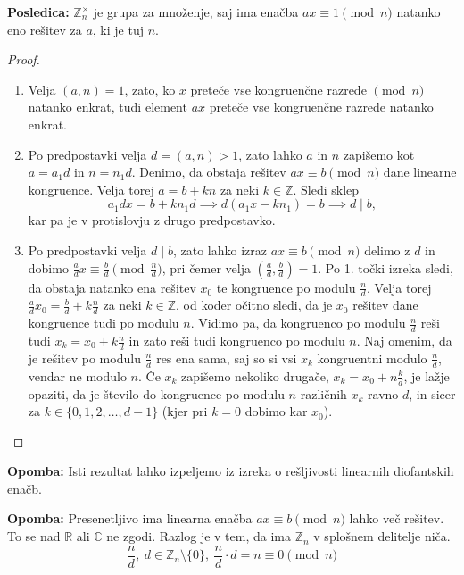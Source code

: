 \documentclass[12pt, a4paper]{article}
\newenvironment{opom}[1][]{\par\medskip\noindent \textbf{Opomba: }}{\medskip}
\newenvironment{posl}[1][]{\par\medskip\noindent \textbf{Posledica: }}{\medskip}
\begin{document}
\begin{posl}
$\mathbb{Z}_{n}^{\times}$ je grupa za množenje, saj ima enačba $ax\equiv 1 \pmod n$ natanko eno rešitev za $a$, ki je tuj $n$.
\end{posl}

\begin{proof}
\begin{enumerate}
\item Velja $(a,n)=1$, zato, ko $x$ preteče vse kongruenčne razrede $\pmod n$ natanko enkrat, tudi element $ax$ preteče vse kongruenčne razrede natanko enkrat.
\item Po predpostavki velja $d=(a,n)>1$, zato lahko $a$ in $n$ zapišemo kot $a=a_{1}d$ in $n=n_{1}d$. Denimo, da obstaja rešitev $ax\equiv b\pmod n$ dane linearne kongruence. Velja torej $a=b + kn$ za neki $k\in \mathbb{Z}$. Sledi sklep
$$a_{1}dx=b+kn_{1}d \implies d(a_{1}x-kn_{1})=b\implies d\mid b,$$
kar pa je v protislovju z drugo predpostavko.
\item Po predpostavki velja $d\mid b$, zato lahko izraz $ax\equiv b \pmod n$ delimo z $d$ in dobimo $\frac{a}{d}x\equiv \frac{b}{d} \pmod{\frac{n}{d}}$, pri čemer velja $(\frac{a}{d}, \frac{b}{d})=1$. Po 1. točki izreka sledi, da obstaja natanko ena rešitev $x_{0}$ te kongruence po modulu $\frac{n}{d}$. Velja torej $\frac{a}{d}x_{0}= \frac{b}{d} +k\frac{n}{d}$ za neki $k\in \mathbb{Z}$, od koder očitno sledi, da je $x_{0}$ rešitev dane kongruence tudi po modulu $n$. Vidimo pa, da kongruenco po modulu $\frac{n}{d}$ reši tudi $x_{k}=x_{0}+k\frac{n}{d}$ in zato reši tudi kongruenco po modulu $n$. Naj omenim, da je rešitev po modulu ${\frac{n}{d}}$ res ena sama, saj so si vsi $x_{k}$ kongruentni modulo $\frac{n}{d}$, vendar ne modulo $n$. Če $x_{k}$ zapišemo nekoliko drugače, $x_{k}=x_{0}+n\frac{k}{d}$, je lažje opaziti, da je število do kongruence po modulu $n$ različnih $x_{k}$ ravno $d$, in sicer za $k\in \{0,1,2,\ldots,d-1\}$ (kjer pri $k=0$ dobimo kar $x_{0}$).
\end{enumerate}
\end{proof}

\begin{opom}
Isti rezultat lahko izpeljemo iz izreka o rešljivosti linearnih diofantskih enačb.
\end{opom}

\begin{opom}
Presenetljivo ima linearna enačba $ax\equiv b\pmod n$ lahko več rešitev. To se nad $\mathbb{R}$ ali $\mathbb{C}$ ne zgodi. Razlog je v tem, da ima $\mathbb{Z}_{n}$ v splošnem delitelje niča.
$$\frac{n}{d},\ d\in \mathbb{Z}_{n}\setminus\{0\},\ \frac{n}{d}\cdot d = n \equiv 0 \pmod n$$
\end{opom}
\end{document}
